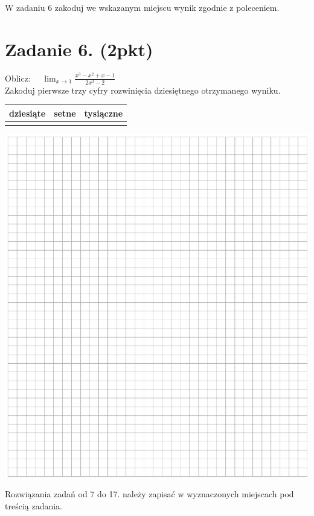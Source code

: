 \documentclass[10pt]{article}
\begin{document}
W zadaniu 6 zakoduj we wskazanym miejscu wynik zgodnie z poleceniem.

\section*{Zadanie 6. (2pkt)}
Oblicz: \(\quad \lim _{x \rightarrow 1} \frac{x^{3}-x^{2}+x-1}{2 x^{3}-2}\)\\
Zakoduj pierwsze trzy cyfry rozwinięcia dziesiętnego otrzymanego wyniku.

\begin{center}
\begin{tabular}{|l|l|l|}
\hline
dziesiąte & setne & tysiączne \\
\hline
 &  &  \\
\hline
\end{tabular}
\end{center}

\begin{center}
\includegraphics[max width=\textwidth]{2024_11_21_12a27a32a51fef2c834ag-04}
\end{center}

Rozwiązania zadań od 7 do 17. należy zapisać w wyznaczonych miejscach pod treścią zadania.
\end{document}
